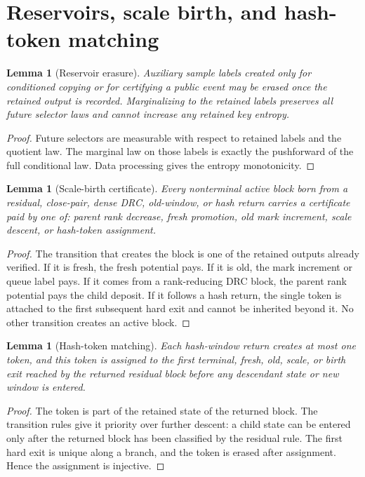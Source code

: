 \documentclass[11pt]{article}
\newtheorem{lemma}[theorem]{Lemma}
\theoremstyle{remark}
\begin{document}
\section{Reservoirs, scale birth, and hash-token matching}\label{app:reservoir-scale}

\begin{lemma}[Reservoir erasure]\label{lem:app-reservoir}
Auxiliary sample labels created only for conditioned copying or for certifying a public event may be erased once the retained output is recorded.  Marginalizing to the retained labels preserves all future selector laws and cannot increase any retained key entropy.
\end{lemma}

\begin{proof}
Future selectors are measurable with respect to retained labels and the quotient law.  The marginal law on those labels is exactly the pushforward of the full conditional law.  Data processing gives the entropy monotonicity.
\end{proof}

\begin{lemma}[Scale-birth certificate]\label{lem:app-scale-birth}
Every nonterminal active block born from a residual, close-pair, dense DRC, old-window, or hash return carries a certificate paid by one of: parent rank decrease, fresh promotion, old mark increment, scale descent, or hash-token assignment.
\end{lemma}

\begin{proof}
The transition that creates the block is one of the retained outputs already verified.  If it is fresh, the fresh potential pays.  If it is old, the mark increment or queue label pays.  If it comes from a rank-reducing DRC block, the parent rank potential pays the child deposit.  If it follows a hash return, the single token is attached to the first subsequent hard exit and cannot be inherited beyond it.  No other transition creates an active block.
\end{proof}

\begin{lemma}[Hash-token matching]\label{lem:app-token}
Each hash-window return creates at most one token, and this token is assigned to the first terminal, fresh, old, scale, or birth exit reached by the returned residual block before any descendant state or new window is entered.
\end{lemma}

\begin{proof}
The token is part of the retained state of the returned block.  The transition rules give it priority over further descent: a child state can be entered only after the returned block has been classified by the residual rule.  The first hard exit is unique along a branch, and the token is erased after assignment.  Hence the assignment is injective.
\end{proof}
\end{document}
